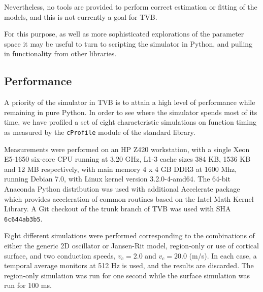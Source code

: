 \documentclass{bioinfo}
\begin{document}
Nevertheless, no tools are provided to perform correct estimation or fitting
of the models, and this is not currently a goal for TVB. 

For this purpose, as well as more sophisticated explorations of the parameter
space it may be useful to turn to scripting the simulator in Python, and pulling
in functionality from other libraries.

\subsection{Performance}

A priority of the simulator in TVB is to attain a high level of performance
while remaining in pure Python. In order to see where the simulator 
spends most of its time, we have profiled 
a set of eight characteristic simulations
on function timing as measured by the 
\texttt{cProfile} module of the standard library. 

Measurements were
performed on an HP Z420 workstation, with a single Xeon E5-1650
six-core CPU running at 3.20 GHz, L1-3 cache sizes 384 KB, 1536 KB
and 12 MB respectively, with main memory 4 x 4 GB DDR3 at 1600 Mhz,
running Debian 7.0, with Linux kernel version 3.2.0-4-amd64. 
The 64-bit Anaconda Python distribution was used with additional Accelerate
package which provides acceleration of common routines based on the 
Intel Math Kernel Library. A Git checkout of the trunk branch of TVB 
was used with SHA \texttt{6c644ab3b5}.

Eight different simulations were performed corresponding to the combinations of
either the generic 2D oscillator or Jansen-Rit model, region-only
or use of cortical surface, and two conduction speeds, $v_c = 2.0$ and
$v_c = 20.0$ (m/s). In each case, a temporal average monitors at 512 Hz
is used, and the results are discarded. The region-only simulation was
run for one second while the surface simulation was run for 100 ms. 
\end{document}
